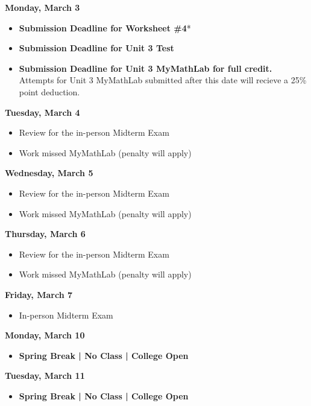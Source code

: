 \documentclass[11pt]{article}
\begin{document}
\textbf{Monday, March 3}

\begin{itemize}
\item \textbf{Submission Deadline for Worksheet \#4}*
\item \textbf{Submission Deadline for Unit 3 Test}
\item \textbf{Submission Deadline for Unit 3 MyMathLab for full credit.} Attempts for Unit 3 MyMathLab submitted after this date will recieve a 25\% point deduction.
\end{itemize}

\textbf{Tuesday, March 4}

\begin{itemize}
\item Review for the in-person Midterm Exam
\item Work missed MyMathLab (penalty will apply)
\end{itemize}

\textbf{Wednesday, March 5}

\begin{itemize}
\item Review for the in-person Midterm Exam
\item Work missed MyMathLab (penalty will apply)
\end{itemize}

\textbf{Thursday, March 6}

\begin{itemize}
\item Review for the in-person Midterm Exam
\item Work missed MyMathLab (penalty will apply)
\end{itemize}

\textbf{Friday, March 7}

\begin{itemize}
\item In-person Midterm Exam
\end{itemize}

\textbf{Monday, March 10}

\begin{itemize}
\item \textbf{Spring Break | No Class | College Open}
\end{itemize}

\textbf{Tuesday, March 11}

\begin{itemize}
\item \textbf{Spring Break | No Class | College Open}
\end{itemize}
\end{document}
